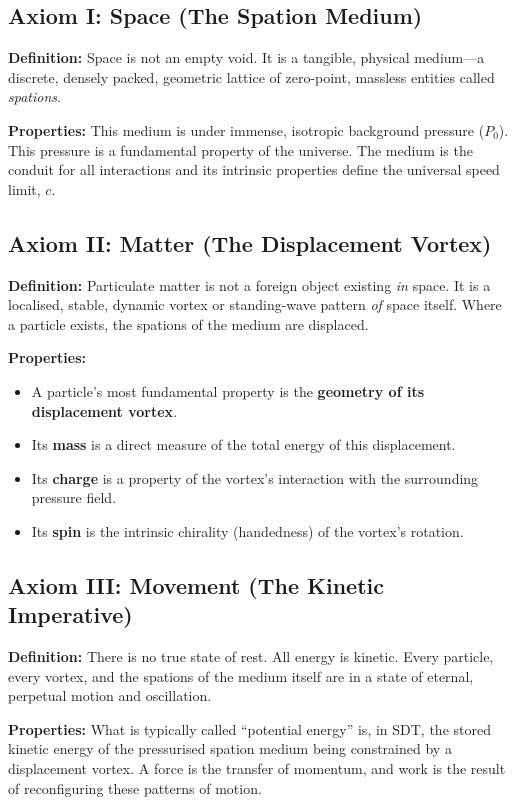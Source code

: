 \subsection{Axiom I: Space (The Spation Medium)}

\textbf{Definition:} Space is not an empty void.  It is a tangible, physical medium---a discrete, densely packed, geometric lattice of zero-point, massless entities called \emph{spations}.

\textbf{Properties:} This medium is under immense, isotropic background pressure ($P_0$).  This pressure is a fundamental property of the universe.  The medium is the conduit for all interactions and its intrinsic properties define the universal speed limit, $c$.

\subsection{Axiom II: Matter (The Displacement Vortex)}

\textbf{Definition:} Particulate matter is not a foreign object existing \emph{in} space.  It is a localised, stable, dynamic vortex or standing-wave pattern \emph{of} space itself.  Where a particle exists, the spations of the medium are displaced.

\textbf{Properties:}
\begin{itemize}
  \item A particle's most fundamental property is the \textbf{geometry of its displacement vortex}.
  \item Its \textbf{mass} is a direct measure of the total energy of this displacement.
  \item Its \textbf{charge} is a property of the vortex's interaction with the surrounding pressure field.
  \item Its \textbf{spin} is the intrinsic chirality (handedness) of the vortex's rotation.
\end{itemize}

\subsection{Axiom III: Movement (The Kinetic Imperative)}

\textbf{Definition:} There is no true state of rest.  All energy is kinetic.  Every particle, every vortex, and the spations of the medium itself are in a state of eternal, perpetual motion and oscillation.

\textbf{Properties:} What is typically called ``potential energy'' is, in SDT, the stored kinetic energy of the pressurised spation medium being constrained by a displacement vortex.  A force is the transfer of momentum, and work is the result of reconfiguring these patterns of motion.


